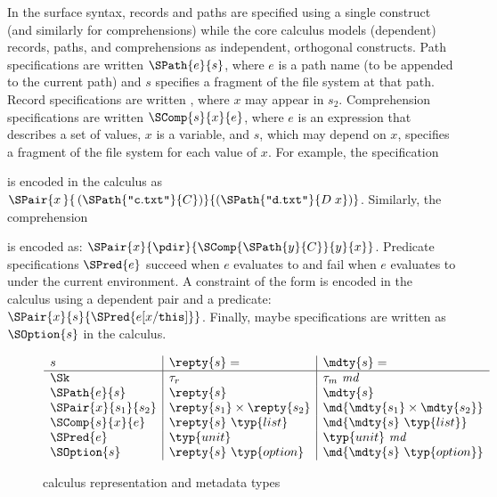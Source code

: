 

In the \forest{} surface syntax, records and paths are specified using
a single construct (and similarly for comprehensions) while the core
calculus models (dependent) records, paths, and comprehensions as
independent, orthogonal constructs.  Path specifications are written
$\SPath{e}{s}$, where $e$ is a path name (to be appended to the
current path) and $s$ specifies a fragment of the file system at that
path. Record specifications are written , where $x$
may appear in $s_2$. Comprehension specifications are written
$\SComp{s}{x}{e}$, where $e$ is an expression that describes a set of
values, $x$ is a variable, and $s$, which may depend on $x$, specifies
a fragment of the file system for each value of $x$.  For example, the
specification
\begin{center}
\end{center}
is encoded in the calculus as
%
\(
\SPair{x\,}{\,(\SPath{\texttt{"}\mathtt{c.txt}\texttt{"}}{C})}{(\SPath{\texttt{"}\mathtt{d.txt}\texttt{"}}{D\; x})} 
\).
Similarly, the comprehension
\begin{center}
\cd{[c :: C | c <- \kw{matches} (GL "*")]} 
\end{center}
is encoded as: \(\SPair{x}{\pdir}{\SComp{\SPath{y}{C}}{y}{x}}
\). Predicate specifications $\SPred{e}$ succeed when $e$ evaluates to
\True{} and fail when $e$ evaluates to \False{} under the current
environment.  A \forest{} constraint of the form 
is encoded in the calculus using a dependent pair and a predicate:
$\SPair{x}{s}{\SPred{e[x/\mathtt{this}]}}$. Finally, maybe
specifications are written as $\SOption{s}$ in the calculus.

\begin{figure}
\[
\begin{array}{l|l|l}
s & \repty{s} = & \mdty{s} =  \\
\hline
\Sk & \tau_r &  \tau_m~\mathit{md} \\
\SPath{e}{s} & \repty{s} & \mdty{s} \\
\SPair{x}{s_1}{s_2} & \repty{s_1} \times \repty{s_2} & \md{\mdty{s_1} \times \mdty{s_2}} \\
\SComp{s}{x}{e} & \repty{s}~\typ{list} & \md{\mdty{s}~\typ{list}}    \\
\SPred{e} & \typ{unit} & \typ{unit}~\mathit{md}\\
\SOption{s} & \repty{s}~\typ{option} & \md{\mdty{s}~\typ{option}} %
\end{array}
\]
\caption{\forest{} calculus representation and metadata types}
\label{fig:ctypes}
\end{figure}

